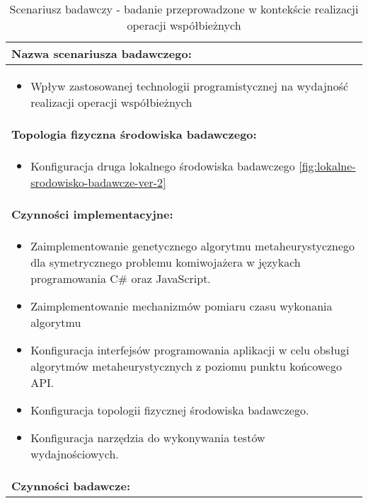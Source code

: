 \setlength{\LTcapwidth}{\textwidth}
\setlength\LTleft{0pt}
\setlength\LTright{0pt}
\begin{longtable}[c]{|llll|}
    \caption{Scenariusz badawczy - badanie przeprowadzone w kontekście realizacji operacji współbieżnych}
    \label{tab:research-scenario-2}                                                  \\ \hline
    \multicolumn{4}{|l|}{\textbf{Nazwa scenariusza badawczego:}}                     \\ \hline
    \multicolumn{4}{|p{\linewidth}|}{
        \begin{itemize}[label={}]
            \item Wpływ zastosowanej technologii programistycznej na wydajność realizacji operacji współbieżnych
          \end{itemize}
    } \\ \hline
    \multicolumn{4}{|l|}{\textbf{Topologia fizyczna środowiska badawczego:}}         \\ \hline
    \multicolumn{4}{|p{\linewidth}|}{
        \begin{itemize}[label={}]
            \item Konfiguracja druga lokalnego środowiska badawczego \ref{fig:lokalne-srodowisko-badawcze-ver-2}
          \end{itemize}
    }\\ \hline
    \multicolumn{4}{|l|}{\textbf{Czynności implementacyjne:}}                        \\ \hline
    \multicolumn{4}{|p{\linewidth}|}{
        \begin{itemize}
            \item Zaimplementowanie genetycznego algorytmu metaheurystycznego dla symetrycznego problemu komiwojażera w językach programowania C\# oraz JavaScript.
            \item Zaimplementowanie mechanizmów pomiaru czasu wykonania algorytmu
            \item Konfiguracja interfejsów programowania aplikacji w celu obsługi algorytmów metaheurystycznych z poziomu punktu końcowego API.
            \item Konfiguracja topologii fizycznej środowiska badawczego.
            \item Konfiguracja narzędzia do wykonywania testów wydajnościowych.
        \end{itemize}}                                                           \\ \hline
    \multicolumn{4}{|l|}{\textbf{Czynności badawcze:}}                               \\ \hline

\end{longtable}
